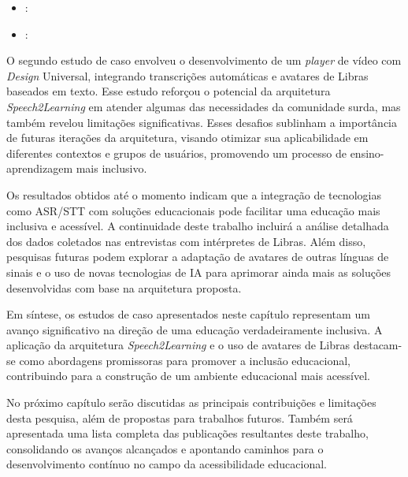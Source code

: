 \begin{itemize}
    \item {}: 

    \item {}: 
\end{itemize}

O segundo estudo de caso envolveu o desenvolvimento de um \textit{player} de vídeo com \textit{Design} Universal, integrando transcrições automáticas e avatares de Libras baseados em texto. Esse estudo reforçou o potencial da arquitetura \textit{Speech2Learning} em atender algumas das necessidades da comunidade surda, mas também revelou limitações significativas. Esses desafios sublinham a importância de futuras iterações da arquitetura, visando otimizar sua aplicabilidade em diferentes contextos e grupos de usuários, promovendo um processo de ensino-aprendizagem mais inclusivo.

Os resultados obtidos até o momento indicam que a integração de tecnologias como ASR/STT com soluções educacionais pode facilitar uma educação mais inclusiva e acessível. A continuidade deste trabalho incluirá a análise detalhada dos dados coletados nas entrevistas com intérpretes de Libras. Além disso, pesquisas futuras podem explorar a adaptação de avatares de outras línguas de sinais e o uso de novas tecnologias de IA para aprimorar ainda mais as soluções desenvolvidas com base na arquitetura proposta.

Em síntese, os estudos de caso apresentados neste capítulo representam um avanço significativo na direção de uma educação verdadeiramente inclusiva. A aplicação da arquitetura \textit{Speech2Learning} e o uso de avatares de Libras destacam-se como abordagens promissoras para promover a inclusão educacional, contribuindo para a construção de um ambiente educacional mais acessível.

No próximo capítulo serão discutidas as principais contribuições e limitações desta pesquisa, além de propostas para trabalhos futuros. Também será apresentada uma lista completa das publicações resultantes deste trabalho, consolidando os avanços alcançados e apontando caminhos para o desenvolvimento contínuo no campo da acessibilidade educacional.

